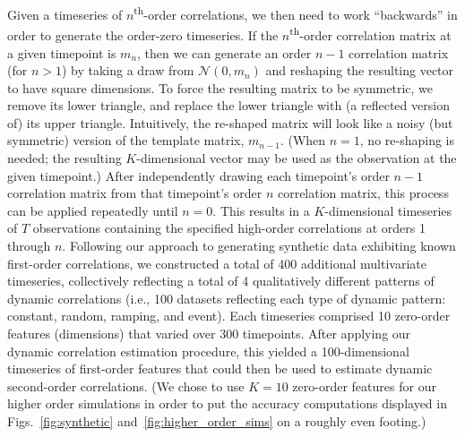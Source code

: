 \documentclass[english]{article}
\begin{document}
Given a timeseries of $n$\textsuperscript{th}-order correlations, we
then need to work ``backwards'' in order to generate the order-zero
timeseries.  If the $n$\textsuperscript{th}-order correlation matrix
at a given timepoint is $m_n$, then we can generate an order $n-1$
correlation matrix (for $n > 1$) by taking a draw from
$\mathcal{N}\left(0, m_n\right)$ and reshaping the resulting vector to
have square dimensions.  To force the resulting matrix to be
symmetric, we remove its lower triangle, and replace the lower
triangle with (a reflected version
of) its upper triangle. Intuitively, the re-shaped matrix will look
like a noisy (but symmetric) version of the template matrix, $m_{n-1}$.  (When
$n = 1$, no re-shaping is needed; the resulting $K$-dimensional vector
may be used as the observation at the given timepoint.)  After
independently drawing each timepoint's order $n-1$ correlation matrix
from that timepoint's order $n$ correlation matrix, this process can
be applied repeatedly until $n = 0$.  This results in a
$K$-dimensional timeseries of $T$ observations containing the
specified high-order correlations at orders 1 through $n$.  Following
our approach to generating synthetic data exhibiting known first-order
correlations, we constructed a total of 400 additional multivariate
timeseries, collectively reflecting a total of 4 qualitatively
different patterns of dynamic correlations (i.e., 100 datasets
reflecting each type of dynamic pattern: constant, random, ramping,
and event).   Each timeseries comprised 10 zero-order features (dimensions)
that varied over 300 timepoints.  After applying our dynamic
correlation estimation procedure, this yielded a 100-dimensional
timeseries of first-order
features that could then be used to estimate dynamic second-order
correlations.  (We chose to use $K=10$ zero-order features for our
higher order simulations in order to put the accuracy computations
displayed in Figs.~\ref{fig:synthetic} and~\ref{fig:higher_order_sims}
on a roughly even footing.)

 
\end{document}
